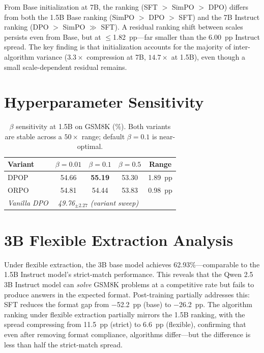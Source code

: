 \documentclass{article}
\begin{document}
From Base initialization at 7B, the ranking (SFT $>$ SimPO $>$ DPO) differs from both the 1.5B Base ranking (SimPO $>$ DPO $>$ SFT) and the 7B Instruct ranking (DPO $>$ SimPO $\gg$ SFT). A residual ranking shift between scales persists even from Base, but at $\leq$1.82~pp---far smaller than the 6.00~pp Instruct spread. The key finding is that initialization accounts for the majority of inter-algorithm variance ($3.3\times$ compression at 7B, $14.7\times$ at 1.5B), even though a small scale-dependent residual remains.

\section{Hyperparameter Sensitivity}
\label{app:hp_sensitivity}

\begin{table}[ht]
\centering
\caption{$\beta$ sensitivity at 1.5B on GSM8K (\%). Both variants are stable across a $50\times$ range; default $\beta = 0.1$ is near-optimal.}
\label{tab:hp_sensitivity}
\small
\begin{tabular}{@{}lcccc@{}}
\toprule
\textbf{Variant} & $\beta = 0.01$ & $\beta = 0.1$ & $\beta = 0.5$ & \textbf{Range} \\
\midrule
DPOP & 54.66 & \textbf{55.19} & 53.30 & 1.89~pp \\
ORPO & 54.81 & 54.44 & 53.83 & 0.98~pp \\
\midrule
\textit{Vanilla DPO} & \multicolumn{3}{c}{\textit{49.76$_{\pm 2.27}$ (variant sweep)}} & \\
\bottomrule
\end{tabular}
\end{table}

\section{3B Flexible Extraction Analysis}
\label{app:3b_flex}

Under flexible extraction, the 3B base model achieves 62.93\%---comparable to the 1.5B Instruct model's strict-match performance. This reveals that the Qwen 2.5 3B Instruct model can \emph{solve} GSM8K problems at a competitive rate but fails to produce answers in the expected format. Post-training partially addresses this: SFT reduces the format gap from $-$52.2~pp (base) to $-$26.2~pp. The algorithm ranking under flexible extraction partially mirrors the 1.5B ranking, with the spread compressing from 11.5~pp (strict) to 6.6~pp (flexible), confirming that even after removing format compliance, algorithms differ---but the difference is less than half the strict-match spread.
\end{document}
